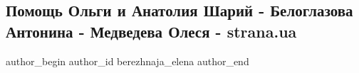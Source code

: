  
 
 
 
 
 
\subsection{Помощь Ольги и Анатолия Шарий - Белоглазова Антонина - Медведева Олеся - strana.ua}
\label{sec:25_08_2021.fb.berezhnaja_elena.1.sharij_pomosch_beloglazova}
 
\ifcmt
 author_begin
   author_id berezhnaja_elena
 author_end
\fi

